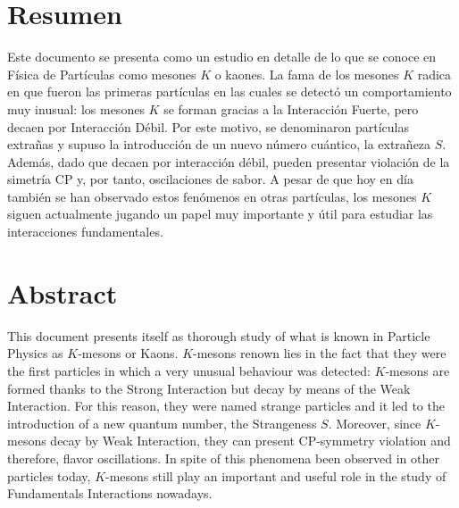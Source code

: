 \chapter*{Resumen}
\label{cap:abstract}

Este documento se presenta como un estudio en detalle de lo que se conoce en Física de Partículas como mesones $K$ o kaones. La fama de los mesones $K$ radica en que fueron las primeras partículas en las cuales se detectó un comportamiento muy inusual: los mesones $K$ se forman gracias a la Interacción Fuerte, pero decaen por Interacción Débil. Por este motivo, se denominaron partículas extrañas y supuso la introducción de un nuevo número cuántico, la extrañeza $S$. Además, dado que decaen por interacción débil, pueden presentar violación de la simetría CP y, por tanto, oscilaciones de sabor. A pesar de que hoy en día también se han observado estos fenómenos en otras partículas, los mesones $K$ siguen actualmente jugando un papel muy importante y útil para estudiar las interacciones fundamentales. 
\vspace{2cm}

{\let\clearpage\relax\chapter*{Abstract}}
This document presents itself as thorough study of what is known in Particle Physics as $K$-mesons or Kaons. $K$-mesons renown lies in the fact that they were the first particles in which a very unusual behaviour was detected: $K$-mesons are formed thanks to the Strong Interaction but decay by means of the Weak Interaction. For this reason, they were named strange particles and it led to the introduction of a new quantum number, the Strangeness $S$. Moreover, since $K$-mesons decay by Weak Interaction, they can present CP-symmetry violation and therefore, flavor oscillations. In spite of this phenomena been observed  in other particles today, $K$-mesons still play an important and useful role in the study of Fundamentals Interactions nowadays.